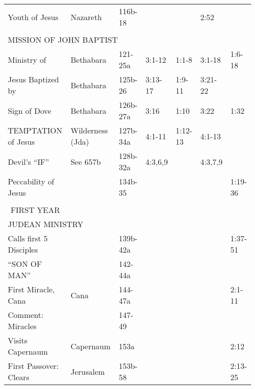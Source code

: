 \begin{longtable}[h]{lllllll}
Youth of Jesus                     & Nazareth            & 116b-18    &                 &                 & 2:52                 & \\
\\
\multicolumn{7}{l}{MISSION OF JOHN BAPTIST} \\
Ministry of                        & Bethabara           & 121-25a    & 3:1-12          & 1:1-8           & 3:1-18               & 1:6-18 \\
Jesus Baptized by                  & Bethabara           & 125b-26    & 3:13-17         & 1:9-11          & 3:21-22              & \\
\quad Sign of Dove                 & Bethabara           & 126b-27a   & 3:16            & 1:10            & 3:22                 & 1:32 \\
TEMPTATION of Jesus                & Wilderness (Jda)    & 127b-34a   & 4:1-11          & 1:12-13         & 4:1-13               & \\
\quad Devil's ``IF''               & See 657b            & 128b-32a   & 4:3,6,9         &                 & 4:3,7,9              & \\
\quad Peccability of Jesus         &                     & 134b-35    &                 &                 &                      & 1:19-36 \\
\\
\multicolumn{1}{c}{FIRST YEAR} \\
\multicolumn{7}{l}{JUDEAN MINISTRY} \\
Calls first 5 Disciples            &                     & 139b-42a   &                 &                 &                      & 1:37-51 \\
\quad ``SON OF MAN''               &                     & 142-44a    &                 &                 &                      & \\
First Miracle, Cana                & Cana                & 144-47a    &                 &                 &                      & 2:1-11 \\
\quad Comment: Miracles            &                     & 147-49     &                 &                 &                      & \\
Visits Capernaum                   & Capernaum           & 153a       &                 &                 &                      & 2:12 \\
First Passover: Clears             & Jerusalem           & 153b-58    &                 &                 &                      & 2:13-25 \\

\end{longtable}
